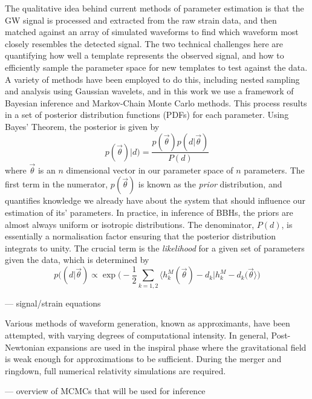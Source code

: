 \documentclass[]{article}
\begin{document}
The qualitative idea behind current methods of parameter estimation is that the GW signal is processed and extracted from the raw strain data, and then matched against an array of simulated waveforms to find which waveform most closely resembles the detected signal. The two technical challenges here are quantifying how well a template represents the observed signal, and how to efficiently sample the parameter space for new templates to test against the data. A variety of methods have been employed to do this, including nested sampling\cite{pe2} and analysis using Gaussian wavelets\cite{props}, and in this work we use a framework of Bayesian inference and Markov-Chain Monte Carlo methods\cite{inj}\cite{pe}\cite{pe4}. This process results in a set of posterior distribution functions (PDFs) for each parameter. Using Bayes' Theorem, the posterior is given by
\begin{equation}
p(\vec{\theta})|d)=\frac{p(\vec{\theta})p(d|\vec{\theta})}{P(d)}
\end{equation}
where $\vec{\theta}$ is an $n$ dimensional vector in our parameter space of $n$ parameters\cite{pe2}. The first term in the numerator, $p(\vec{\theta})$ is known as the \textit{prior} distribution, and quantifies knowledge we already have about the system that should influence our estimation of its' parameters. In practice, in inference of BBHs, the priors are almost always uniform or isotropic distributions. The denominator, $P(d)$, is essentially a normalisation factor ensuring that the posterior distribution integrats to unity. The crucial term is the \textit{likelihood} for a given set of parameters given the data, which is determined by
\begin{equation}
p((d|\vec{\theta})\propto \exp\bigg(-\frac{1}{2}\sum_{k=1,2}\Big \langle h^M_k(\vec{\theta})-d_k \big\vert h^M_k-d_k(\vec{\theta} \Big \rangle\bigg)
\end{equation}

--- signal/strain equations

Various methods of waveform generation, known as approximants, have been attempted, with varying degrees of computational intensity. In general, Post-Newtonian expansions are used in the inspiral phase where the gravitational field is weak enough for approximations to be sufficient. During the merger and ringdown, full numerical relativity simulations are required\cite{waveforms}\cite{imr}.

--- overview of MCMCs that will be used for inference
\end{document}
